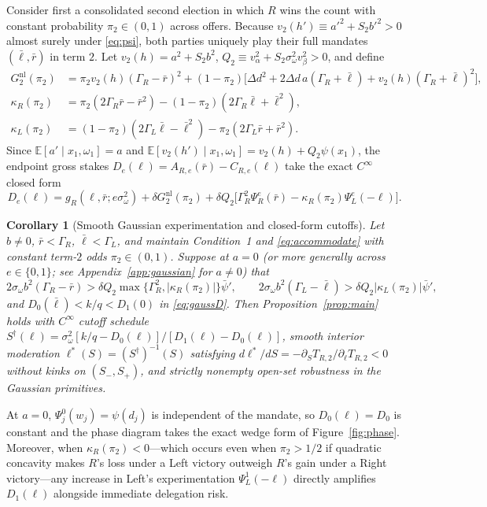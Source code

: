 \documentclass[11pt,letterpaper]{article}
\newtheorem{corollary}{Corollary}
\newcommand{\E}{\mathbb E}
\newcommand{\Dd}{\Delta d}
\begin{document}
Consider first a consolidated second election in which $R$ wins the count with constant probability $\pi_2\in(0,1)$ across offers. Because $v_2(h')\equiv a'^2+S_2 b'^2>0$ almost surely under \eqref{eq:psi}, both parties uniquely play their full mandates $(\bar\ell,\bar r)$ in term $2$. Let $v_2(h)=a^2+S_2 b^2$, $Q_2\equiv v_\alpha^2+S_2\sigma_\omega^2 v_\beta^2>0$, and define
\begin{align*}
 G_2^{\mathrm{nl}}(\pi_2) &= \pi_2 v_2(h)(\Gamma_R-\bar r)^2+(1-\pi_2)\big[\Dd^2+2\Dd\,a(\Gamma_R+\bar\ell)+v_2(h)(\Gamma_R+\bar\ell)^2\big],\\
 \kappa_R(\pi_2) &= \pi_2(2\Gamma_R\bar r-\bar r^2)-(1-\pi_2)(2\Gamma_R\bar\ell+\bar\ell^2),\\
 \kappa_L(\pi_2) &= (1-\pi_2)(2\Gamma_L\bar\ell-\bar\ell^2)-\pi_2(2\Gamma_L\bar r+\bar r^2).
\end{align*}
Since $\E[a'\mid x_1,\omega_1]=a$ and $\E[v_2(h')\mid x_1,\omega_1]=v_2(h)+Q_2\psi(x_1)$, the endpoint gross stakes $D_e(\ell)=A_{R,e}(\bar r)-C_{R,e}(\ell)$ take the exact $C^\infty$ closed form
\begin{equation}
 D_e(\ell)=g_R(\ell,\bar r;e\sigma_\omega^2)+\delta G_2^{\mathrm{nl}}(\pi_2)
 +\delta Q_2\Big[\Gamma_R^2\Psi_R^e(\bar r)-\kappa_R(\pi_2)\Psi_L^e(-\ell)\Big].
 \label{eq:gaussD}
\end{equation}

\begin{corollary}[Smooth Gaussian experimentation and closed-form cutoffs]\label{cor:family}
Let $b\ne 0$, $\bar r<\Gamma_R$, $\bar\ell<\Gamma_L$, and maintain Condition~1 and \eqref{eq:accommodate} with constant term-$2$ odds $\pi_2\in(0,1)$. Suppose at $a=0$ (or more generally across $e\in\{0,1\}$; see Appendix~\ref{app:gaussian} for $a\ne 0$) that
\[
 2\sigma_\omega b^2(\Gamma_R-\bar r)>\delta Q_2\max\{\Gamma_R^2,|\kappa_R(\pi_2)|\}\bar\psi',\qquad
 2\sigma_\omega b^2(\Gamma_L-\bar\ell)>\delta Q_2|\kappa_L(\pi_2)|\bar\psi',
\]
and $D_0(\bar\ell)<k/q<D_1(0)$ in \eqref{eq:gaussD}. Then Proposition~\ref{prop:main} holds with $C^\infty$ cutoff schedule $S^\dagger(\ell)=\sigma_\omega^2[k/q-D_0(\ell)]/[D_1(\ell)-D_0(\ell)]$, smooth interior moderation $\ell^*(S)=(S^\dagger)^{-1}(S)$ satisfying $d\ell^*/dS=-\partial_S T_{R,2}/\partial_\ell T_{R,2}<0$ without kinks on $(S_-,S_+)$, and strictly nonempty open-set robustness in the Gaussian primitives.
\end{corollary}

At $a=0$, $\Psi_j^0(w_j)=\psi(d_j)$ is independent of the mandate, so $D_0(\ell)=D_0$ is constant and the phase diagram takes the exact wedge form of Figure~\ref{fig:phase}. Moreover, when $\kappa_R(\pi_2)<0$---which occurs even when $\pi_2>1/2$ if quadratic concavity makes $R$'s loss under a Left victory outweigh $R$'s gain under a Right victory---any increase in Left's experimentation $\Psi_L^1(-\ell)$ directly amplifies $D_1(\ell)$ alongside immediate delegation risk.
\end{document}
